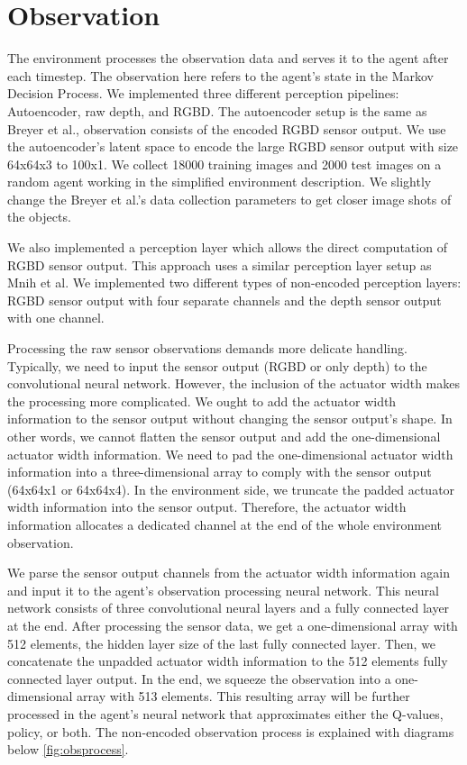 \section{Observation}

The environment processes the observation data and serves it to the agent after each timestep. The observation here refers to the agent's state in the Markov Decision Process. We implemented three different perception pipelines: Autoencoder, raw depth, and RGBD. The autoencoder setup is the same as Breyer et al., observation consists of the encoded RGBD sensor output. We use the autoencoder's latent space to encode the large RGBD sensor output with size 64x64x3 to 100x1. We collect 18000 training images and 2000 test images on a random agent working in the simplified environment description. We slightly change the Breyer et al.'s data collection parameters to get closer image shots of the objects.

We also implemented a perception layer which allows the direct computation of RGBD sensor output. This approach uses a similar perception layer setup as Mnih et al. We implemented two different types of non-encoded perception layers: RGBD sensor output with four separate channels and the depth sensor output with one channel. 

Processing the raw sensor observations demands more delicate handling. Typically, we need to input the sensor output (RGBD or only depth) to the convolutional neural network. However, the inclusion of the actuator width makes the processing more complicated. We ought to add the actuator width information to the sensor output without changing the sensor output's shape. In other words, we cannot flatten the sensor output and add the one-dimensional actuator width information. We need to pad the one-dimensional actuator width information into a three-dimensional array to comply with the sensor output (64x64x1 or 64x64x4). In the environment side, we truncate the padded actuator width information into the sensor output. Therefore, the actuator width information allocates a dedicated channel at the end of the whole environment observation. 

We parse the sensor output channels from the actuator width information again and input it to the agent's observation processing neural network. This neural network consists of three convolutional neural layers and a fully connected layer at the end. After processing the sensor data, we get a one-dimensional array with 512 elements, the hidden layer size of the last fully connected layer. Then, we concatenate the unpadded actuator width information to the 512 elements fully connected layer output. In the end, we squeeze the observation into a one-dimensional array with 513 elements. This resulting array will be further processed in the agent's neural network that approximates either the Q-values, policy, or both. The non-encoded observation process is explained with diagrams below \ref{fig:obsprocess}.

